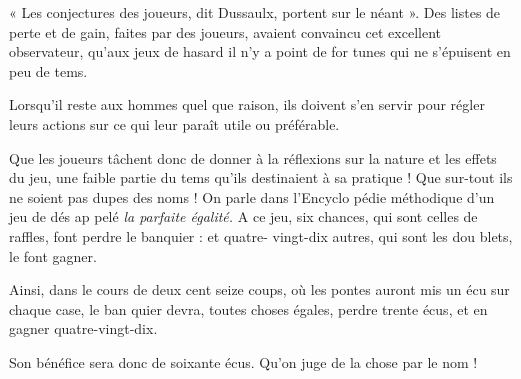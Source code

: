 « Les conjectures des joueurs, dit
Dussaulx, portent sur le néant ».
Des listes de perte et de gain, faites
par des joueurs, avaient convaincu
cet excellent observateur, qu'aux
jeux de hasard il n'y a point de for%
tunes qui ne s'épuisent en peu de
tems.

Lorsqu'il reste aux hommes quel%
que raison, ils doivent s'en servir
pour régler leurs actions sur ce qui
leur paraît utile ou préférable.

Que les joueurs tâchent donc de
donner à la réflexions sur la nature et
les effets du jeu, une faible partie du
tems qu'ils destinaient à sa pratique !
Que sur-tout ils ne soient pas dupes
des noms ! On parle dans l'Encyclo%
pédie méthodique d'un jeu de dés ap%
pelé \emph{la parfaite égalité.} A ce jeu, six
chances, qui sont celles de raffles,
font perdre le banquier : et quatre-%
vingt-dix autres, qui sont les dou%
blets, le font gagner.

Ainsi, dans le cours de deux cent
seize coups, où les pontes auront mis
un écu sur chaque case, le ban%
quier devra, toutes choses égales,
perdre trente écus, et en gagner
quatre-vingt-dix.

Son bénéfice sera donc de soixante
écus. Qu'on juge de la chose par le 
nom !
